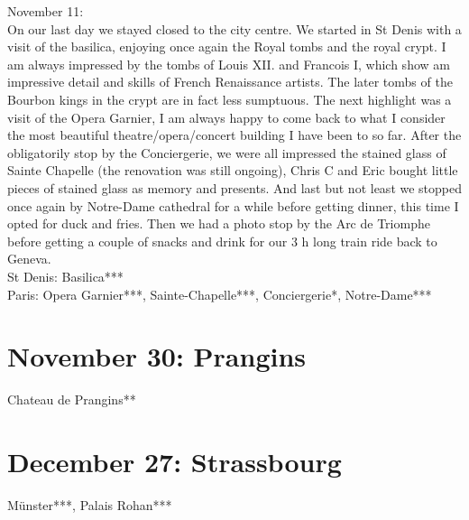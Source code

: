 November 11:\\
On our last day we stayed closed to the city centre. We started in St Denis with a visit of the basilica, enjoying once again the Royal tombs and the royal crypt. I am always impressed by the tombs of Louis XII. and Francois I, which show am impressive detail and skills of French Renaissance artists. The later tombs of the Bourbon kings in the crypt are in fact less sumptuous. The next highlight was a visit of the Opera Garnier, I am always happy to come back to what I consider the most beautiful theatre/opera/concert building I have been to so far. After the obligatorily stop by the Conciergerie, we were all impressed the stained glass of Sainte Chapelle (the renovation was still ongoing), Chris C and Eric bought little pieces of stained glass as memory and presents. And last but not least we stopped once again by Notre-Dame cathedral for a while before getting dinner, this time I opted for duck and fries. Then we had a photo stop by the Arc de Triomphe before getting a couple of snacks and drink for our 3 h long train ride back to Geneva.\\

St Denis: Basilica***\\
Paris: Opera Garnier***, Sainte-Chapelle***, Conciergerie*, Notre-Dame***

\section{November 30: Prangins}
\label{2013:Prangins}

Chateau de Prangins**

\section{December 27: Strassbourg}
\label{2013Strassbourg}

M\"unster***, Palais Rohan***